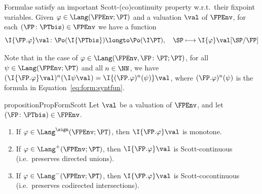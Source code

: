 Formulae satisfy an important Scott-(co)continuity property
w.r.t.\ their fixpoint variables.
%
Given $\varphi \in \Lang(\FPEnv;\PT)$ and a valuation $\val$ of $\FPEnv$,
for each $(\FP \colon \PTbis) \in \FPEnv$
we have a function
\[
  \I{\FP.\varphi}\val \colon
  \Po(\I{\PTbis})
  \longto
  \Po(\I\PT)
  ,\quad
  \SP
  \longmapsto
  \I{\varphi}\val[\SP/\FP]
\]

\noindent
Note that in the case of
$\varphi \in \Lang(\FPEnv,\FP \colon \PT;\PT)$,
for all $\psi \in \Lang(\FPEnv;\PT)$ and all $n \in \NN$,
we have
$(\I{\FP.\varphi}\val)^n(\I\psi\val) = \I{(\FP.\varphi)^n(\psi)}\val$,
where
$(\FP.\varphi)^n(\psi)$ is the formula in Equation~\eqref{eq:form:syntfun}.

\begin{restatable}{proposition}{PropFormScott}
\label{prop:sem:log:scott}
Let $\val$ be a valuation of $\FPEnv$, and let $(\FP \colon \PTbis) \in \FPEnv$.
\begin{enumerate}[(1)]
\item
\label{item:sem:log:scott:mon}
If $\varphi \in \Lang^\sign(\FPEnv;\PT)$,
then $\I{\FP.\varphi}\val$ is monotone.

\item
\label{item:sem:log:scott:pos}
If $\varphi \in \Lang^+(\FPEnv;\PT)$,
then $\I{\FP.\varphi}\val$ is Scott-continuous
(i.e.\ preserves directed unions).

\item
\label{item:sem:log:scott:neg}
If $\varphi \in \Lang^-(\FPEnv;\PT)$,
then $\I{\FP.\varphi}\val$ is Scott-cocontinuous
(i.e.\ preserves codirected intersections).
\end{enumerate}
\end{restatable}

